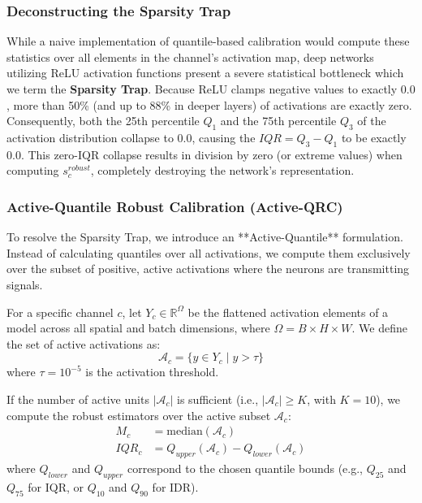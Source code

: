 \documentclass{article}
\theoremstyle{plain}
\theoremstyle{definition}
\theoremstyle{remark}
\begin{document}
\subsubsection{Deconstructing the Sparsity Trap}
While a naive implementation of quantile-based calibration would compute these statistics over all elements in the channel's activation map, deep networks utilizing ReLU activation functions present a severe statistical bottleneck which we term the \textbf{Sparsity Trap}. 
Because ReLU clamps negative values to exactly $0.0$, more than 50\% (and up to 88\% in deeper layers) of activations are exactly zero. 
Consequently, both the 25th percentile $Q_1$ and the 75th percentile $Q_3$ of the activation distribution collapse to $0.0$, causing the $IQR = Q_3 - Q_1$ to be exactly $0.0$. 
This zero-IQR collapse results in division by zero (or extreme values) when computing $s_c^{robust}$, completely destroying the network's representation.

\subsubsection{Active-Quantile Robust Calibration (Active-QRC)}
To resolve the Sparsity Trap, we introduce an **Active-Quantile** formulation. Instead of calculating quantiles over all activations, we compute them exclusively over the subset of positive, active activations where the neurons are transmitting signals.

For a specific channel $c$, let $Y_{c} \in \mathbb{R}^{\Omega}$ be the flattened activation elements of a model across all spatial and batch dimensions, where $\Omega = B \times H \times W$. We define the set of active activations as:
\begin{equation}
  \mathcal{A}_{c} = \{ y \in Y_{c} \mid y > \tau \}
\end{equation}
where $\tau = 10^{-5}$ is the activation threshold. 

If the number of active units $|\mathcal{A}_{c}|$ is sufficient (i.e., $|\mathcal{A}_{c}| \geq K$, with $K=10$), we compute the robust estimators over the active subset $\mathcal{A}_{c}$:
\begin{align}
  M_c &= \text{median}(\mathcal{A}_{c}) \\
  IQR_c &= Q_{upper}(\mathcal{A}_{c}) - Q_{lower}(\mathcal{A}_{c})
\end{align}
where $Q_{lower}$ and $Q_{upper}$ correspond to the chosen quantile bounds (e.g., $Q_{25}$ and $Q_{75}$ for IQR, or $Q_{10}$ and $Q_{90}$ for IDR).
\end{document}
